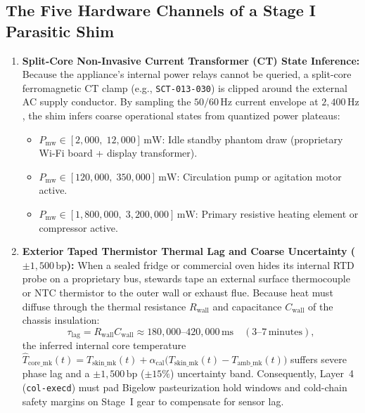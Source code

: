 \subsection{The Five Hardware Channels of a Stage I Parasitic Shim}

\begin{enumerate}
    \item \textbf{Split-Core Non-Invasive Current Transformer (CT) State Inference:} Because the appliance's internal power relays cannot be queried, a split-core ferromagnetic CT clamp (e.g., \texttt{SCT-013-030}) is clipped around the external AC supply conductor. By sampling the $50/60\,\mathrm{Hz}$ current envelope at $2{,}400\,\mathrm{Hz}$, the shim infers coarse operational states from quantized power plateaus:
    \begin{itemize}
        \item $P_{\mathrm{mw}} \in [2{,}000,\; 12{,}000]\,\mathrm{mW}$: Idle standby phantom draw (proprietary Wi-Fi board + display transformer).
        \item $P_{\mathrm{mw}} \in [120{,}000,\; 350{,}000]\,\mathrm{mW}$: Circulation pump or agitation motor active.
        \item $P_{\mathrm{mw}} \in [1{,}800{,}000,\; 3{,}200{,}000]\,\mathrm{mW}$: Primary resistive heating element or compressor active.
    \end{itemize}
    \item \textbf{Exterior Taped Thermistor Thermal Lag and Coarse Uncertainty ($\pm 1{,}500\,\mathrm{bp}$):} When a sealed fridge or commercial oven hides its internal RTD probe on a proprietary bus, stewards tape an external surface thermocouple or NTC thermistor to the outer wall or exhaust flue. Because heat must diffuse through the thermal resistance $R_{\mathrm{wall}}$ and capacitance $C_{\mathrm{wall}}$ of the chassis insulation:
    \begin{equation}
        \tau_{\mathrm{lag}} = R_{\mathrm{wall}} C_{\mathrm{wall}} \approx 180{,}000\text{--}420{,}000\,\mathrm{ms} \quad (3\text{--}7\,\text{minutes}),
        \label{eq:l2-shim-thermal-lag}
    \end{equation}
    the inferred internal core temperature $\hat{T}_{\mathrm{core\_mk}}(t) = T_{\mathrm{skin\_mk}}(t) + \alpha_{\mathrm{cal}}\bigl(T_{\mathrm{skin\_mk}}(t) - T_{\mathrm{amb\_mk}}(t)\bigr)$ suffers severe phase lag and a $\pm 1{,}500\,\mathrm{bp}$ ($\pm 15\%$) uncertainty band. Consequently, Layer~4 (\texttt{col-execd}) must pad Bigelow pasteurization hold windows and cold-chain safety margins on Stage~I gear to compensate for sensor lag.

\end{enumerate}
